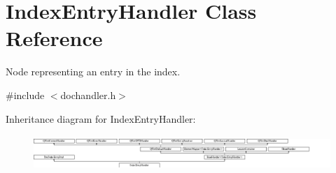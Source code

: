 \hypertarget{class_index_entry_handler}{}\section{Index\+Entry\+Handler Class Reference}
\label{class_index_entry_handler}


Node representing an entry in the index.  




{\ttfamily \#include $<$dochandler.\+h$>$}

Inheritance diagram for Index\+Entry\+Handler\+:\begin{figure}[H]
\begin{center}
\leavevmode
\includegraphics[height=1.350211cm]{class_index_entry_handler}
\end{center}
\end{figure}
